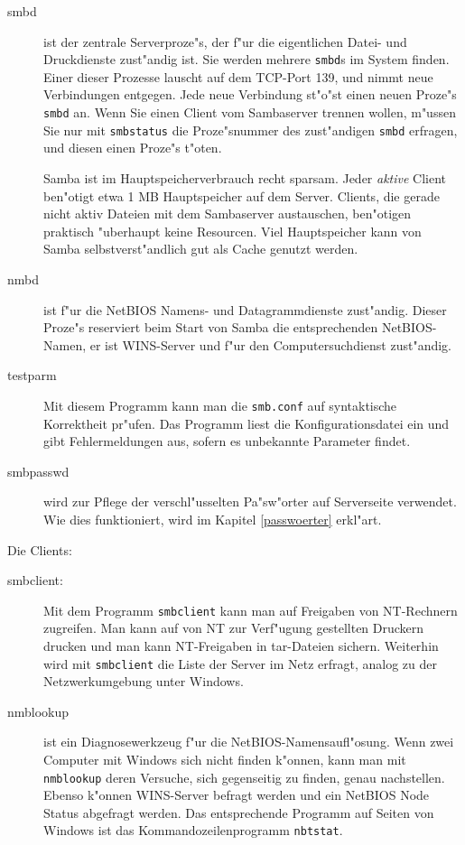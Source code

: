 \documentclass{scrartcl}
\newcommand{\prog}{\texttt}
\newcommand{\datei}{\texttt}
\begin{document}
\begin{description}
  
\item[smbd] ist der zentrale Serverproze"s, der f"ur die eigentlichen
  Datei- und Druckdienste zust"andig ist. Sie werden mehrere
  \prog{smbd}s im System finden. Einer dieser Prozesse lauscht auf dem
  TCP-Port 139, und nimmt neue Verbindungen entgegen. Jede neue
  Verbindung st"o"st einen neuen Proze"s \prog{smbd} an. Wenn Sie
  einen Client vom Sambaserver trennen wollen, m"ussen Sie nur mit
  \prog{smbstatus} die Proze"snummer des zust"andigen \prog{smbd}
  erfragen, und diesen einen Proze"s t"oten.
  
  Samba ist im Hauptspeicherverbrauch recht sparsam. Jeder
  \emph{aktive} Client ben"otigt etwa 1 MB Hauptspeicher auf dem
  Server. Clients, die gerade nicht aktiv Dateien mit dem Sambaserver
  austauschen, ben"otigen praktisch "uberhaupt keine Resourcen. Viel
  Hauptspeicher kann von Samba selbstverst"andlich gut als Cache
  genutzt werden.
  
\item[nmbd] ist f"ur die NetBIOS Namens- und Datagrammdienste
  zust"andig. Dieser Proze"s reserviert beim Start von Samba die
  entsprechenden NetBIOS-Namen, er ist WINS-Server und f"ur den
  Computersuchdienst zust"andig.
  
\item[testparm] Mit diesem Programm kann man die \datei{smb.conf} auf
  syntaktische Korrektheit pr"ufen. Das Programm liest die
  Konfigurationsdatei ein und gibt Fehlermeldungen aus, sofern es
  unbekannte Parameter findet.
  
\item[smbpasswd] wird zur Pflege der verschl"usselten Pa"sw"orter auf
  Serverseite verwendet. Wie dies funktioniert, wird im Kapitel
  \ref{passwoerter} erkl"art.

\end{description}

Die Clients:

\begin{description}
  
\item[smbclient:] Mit dem Programm \prog{smbclient} kann man auf
  Freigaben von NT-Rechnern zugreifen. Man kann auf von NT zur
  Verf"ugung gestellten Druckern drucken und man kann NT-Freigaben in
  tar-Dateien sichern.  Weiterhin wird mit \prog{smbclient} die Liste
  der Server im Netz erfragt, analog zu der Netzwerkumgebung unter
  Windows.
  
\item[nmblookup] ist ein Diagnosewerkzeug f"ur die
  NetBIOS-Namensaufl"osung. Wenn zwei Computer mit Windows sich
  nicht finden k"onnen, kann man mit \prog{nmblookup} deren Versuche,
  sich gegenseitig zu finden, genau nachstellen. Ebenso k"onnen
  WINS-Server befragt werden und ein NetBIOS Node Status abgefragt
  werden. Das entsprechende Programm auf Seiten von Windows ist das
  Kommandozeilenprogramm \prog{nbtstat}.

\end{description}
\end{document}
